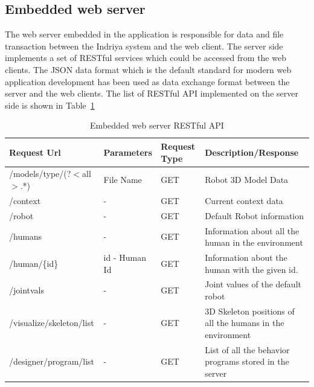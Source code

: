 \subsection*{Embedded web server}
The web server embedded in the application is responsible for data and file transaction between the Indriya system and the web client. The server side implements a set of RESTful services which could be accessed from the web clients. The JSON data format which is the default standard for modern web application development has been used as data exchange format between the server and the web clients. The list of RESTful API implemented on the server side is shown in Table~\ref{table:restful_api}
\begin{table}[H]
\centering
\small
\caption{Embedded web server RESTful API}
\label{table:restful_api}
\begin{tabular}{|l|p{2.8cm}|p{1.2cm}|p{5.5cm}|}
\hline
  \textbf{Request Url}  & \textbf{Parameters} & \textbf{Request Type} & \textbf{Description/Response}
  \tabularnewline \hline
  /models/{type}/(?$<$all$>$.*) & File Name & GET & Robot 3D Model Data
                                          \tabularnewline\hline
                                          
  /context  & - & GET & Current context data  
  										                    \tabularnewline\hline
  										 
  /robot  &  - & GET & Default Robot information  
  										                    \tabularnewline\hline										 
  
  /humans & - & GET  & Information about all the human in the environment  
                                          \tabularnewline\hline
                                          
  /human/\{id\} & id - Human Id & GET  & Information about the human with the given id.  
                                          \tabularnewline\hline
                                          
  /jointvals & - & GET  & Joint values of the default robot  
                                          \tabularnewline\hline
                                          
  /visualize/skeleton/list & - & GET  & 3D Skeleton positions of all the humans in the environment  
                                          \tabularnewline\hline                                        
       
  /designer/program/list & - & GET  & List of all the behavior programs stored in the server  
                                          \tabularnewline\hline                                                               
                                          

\end{tabular}
\end{table}
